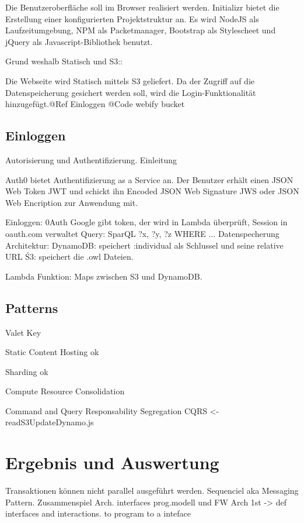 \documentclass[
12pt,
english,
ngerman,
headsepline,
twoside,
openright,
numbers=noenddot,version=first
]{scrreprt}
\begin{document}
Die Benutzeroberfläche soll im Browser realisiert werden. Initializr bietet die Erstellung einer konfigurierten Projektstruktur an. Es wird NodeJS als Laufzeitumgebung, NPM als Packetmanager, Bootstrap als Stylescheet und jQuery als Javascript-Bibliothek benutzt. 

Grund weshalb Statisch und S3:: 

Die Webseite wird Statisch mittels S3 geliefert. Da der Zugriff auf die Datenspeicherung gesichert werden soll, wird die  Login-Funktionalität hinzugefügt.@Ref Einloggen
@Code webify bucket



\section{Einloggen}

Autorisierung und Authentifizierung. Einleitung

Auth0 bietet Authentifizierung as a Service an. Der Benutzer erhält einen JSON Web Token JWT und schickt ihn Encoded JSON Web Signature JWS oder JSON Web Encription zur Anwendung mit.


Einloggen: 0Auth Google gibt token, der wird in Lambda überprüft, Session in oauth.com verwaltet
Query: SparQL ?x, ?y, ?z WHERE ...
Datenspecherung Architektur:
DynamoDB: speichert :individual als Schlussel und seine relative URL
Ś3: speichert die .owl Dateien.

Lambda Funktion: Maps zwischen S3 und DynamoDB.

\section{Patterns}

Valet Key \cite{homer2014cloud}

Static Content Hosting ok

Sharding ok

Compute Resource Consolidation 

Command and Query Responsability Segregation CQRS <- readS3UpdateDynamo.js

\chapter{Ergebnis und Auswertung}
Transaktionen können nicht parallel ausgeführt werden. Sequenciel aka Messaging Pattern.
Zusammenspiel Arch. interfaces prog.modell und FW
Arch 1st -> def interfaces and interactions. to program to a inteface
\end{document}
